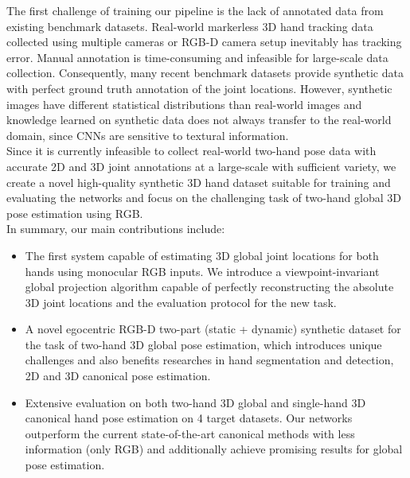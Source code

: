 \documentclass[10pt,twocolumn,letterpaper]{article}
\begin{document}
\indent The first challenge of training our pipeline is the lack of annotated data from existing benchmark datasets. Real-world markerless 3D hand tracking data collected using multiple cameras or RGB-D camera setup inevitably has tracking error. Manual annotation is time-consuming and infeasible for large-scale data collection. Consequently, many recent benchmark datasets provide synthetic data with perfect ground truth annotation of the joint locations. However, synthetic images have different statistical distributions than real-world images and knowledge learned on synthetic data does not always transfer to the real-world domain, since CNNs are sensitive to textural information. \\
\indent Since it is currently infeasible to collect real-world two-hand pose data with accurate 2D and 3D joint annotations at a large-scale with sufficient variety, we create a novel high-quality synthetic 3D hand dataset suitable for training and evaluating the networks and focus on the challenging task of two-hand global 3D pose estimation using RGB.\\
\indent In summary, our main contributions include:
\begin{itemize}[noitemsep]
  \item The first system capable of estimating 3D global joint locations for both hands using monocular RGB inputs. We introduce a viewpoint-invariant global projection algorithm capable of perfectly reconstructing the absolute 3D joint locations and the evaluation protocol for the new task.
  \item A novel egocentric RGB-D two-part (static + dynamic) synthetic dataset for the task of two-hand 3D global pose estimation, which introduces unique challenges and also benefits researches in hand segmentation and detection, 2D and 3D canonical pose estimation. 
  \item Extensive evaluation on both two-hand 3D global and single-hand 3D canonical hand pose estimation on 4 target datasets. Our networks outperform the current state-of-the-art canonical methods with less information (only RGB) and additionally achieve promising results for global pose estimation.
\end{itemize}
\end{document}
